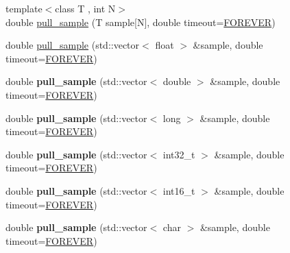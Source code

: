 \begin{DoxyCompactItemize}
\item 
{\footnotesize template$<$class T , int N$>$ }\\double \hyperlink{classlsl_1_1stream__inlet_a58dc91be6ec0d1b83024a169ad0c292b}{pull\+\_\+sample} (T sample\mbox{[}N\mbox{]}, double timeout=\hyperlink{namespacelsl_a74cfbc9077aca21295117217249721ed}{F\+O\+R\+E\+V\+ER})
\item 
double \hyperlink{classlsl_1_1stream__inlet_af3707fbfd5e9f54be73f9d55de55a8fc}{pull\+\_\+sample} (std\+::vector$<$ float $>$ \&sample, double timeout=\hyperlink{namespacelsl_a74cfbc9077aca21295117217249721ed}{F\+O\+R\+E\+V\+ER})
\item 
\mbox{\label{classlsl_1_1stream__inlet_a447dd270fa83d8f1df16963b8601027e}} 
double {\bfseries pull\+\_\+sample} (std\+::vector$<$ double $>$ \&sample, double timeout=\hyperlink{namespacelsl_a74cfbc9077aca21295117217249721ed}{F\+O\+R\+E\+V\+ER})
\item 
\mbox{\label{classlsl_1_1stream__inlet_a80fecf88ba609c7e4898eb16a49f2b75}} 
double {\bfseries pull\+\_\+sample} (std\+::vector$<$ long $>$ \&sample, double timeout=\hyperlink{namespacelsl_a74cfbc9077aca21295117217249721ed}{F\+O\+R\+E\+V\+ER})
\item 
\mbox{\label{classlsl_1_1stream__inlet_af33558ccbbe57767386278d2255db1a1}} 
double {\bfseries pull\+\_\+sample} (std\+::vector$<$ int32\+\_\+t $>$ \&sample, double timeout=\hyperlink{namespacelsl_a74cfbc9077aca21295117217249721ed}{F\+O\+R\+E\+V\+ER})
\item 
\mbox{\label{classlsl_1_1stream__inlet_a7789d75e1afceaf5187e8bc33a0b99be}} 
double {\bfseries pull\+\_\+sample} (std\+::vector$<$ int16\+\_\+t $>$ \&sample, double timeout=\hyperlink{namespacelsl_a74cfbc9077aca21295117217249721ed}{F\+O\+R\+E\+V\+ER})
\item 
\mbox{\label{classlsl_1_1stream__inlet_a3a2a662e0b723d7f2101b79eb08371b7}} 
double {\bfseries pull\+\_\+sample} (std\+::vector$<$ char $>$ \&sample, double timeout=\hyperlink{namespacelsl_a74cfbc9077aca21295117217249721ed}{F\+O\+R\+E\+V\+ER})
\item 
\mbox{\label{classlsl_1_1stream__inlet_a78a36bf33ddfc7101bd15cb5bcb9561d}} 

\end{DoxyCompactItemize}
